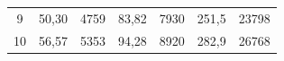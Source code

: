 \begin{table}[h!]
\begin{tabular}{c|c|c|c|c|c|c}

9& 

50,30& 

4759& 

83,82& 

7930& 

251,5& 

23798 \\


10& 

56,57& 

5353& 

94,28& 

8920& 

282,9& 

26768 \\

\hline

\end{tabular}



\end{table}





